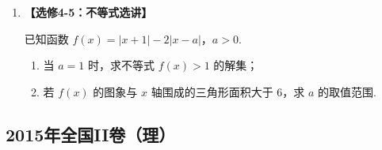 \begin{description}
\begin{enumerate}[leftmargin=5pt]
        \item \textbf{【选修4-5：不等式选讲】}

已知函数 \( f(x) = |x + 1| - 2|x - a| \)，\( a > 0 \).

\begin{enumerate}
\item 当 \(a = 1\) 时，求不等式 \(f(x) > 1\) 的解集；
\item 若 \( f(x) \) 的图象与 \( x \) 轴围成的三角形面积大于 6，求 \( a \) 的取值范围.
\end{enumerate}

    \end{enumerate}

\end{description}


\subsection{2015年全国II卷（理）}\label{gk:2015年全国II卷（理）}

